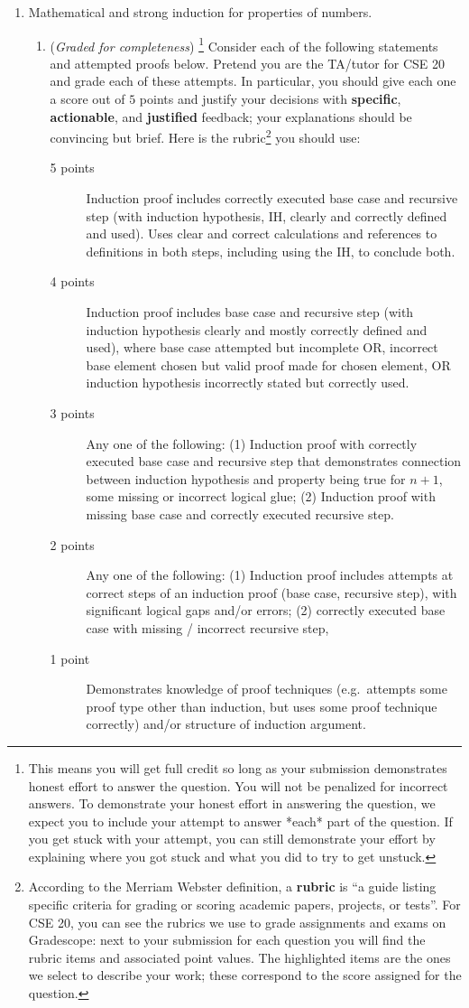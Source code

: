 \documentclass[12pt, oneside]{article}
\newcommand{\gradeComplete}{({\it Graded for completeness}) }
\newcommand{\gradeCompleteFirst}{\gradeComplete\footnote{This means you will 
get full credit so long as your submission demonstrates honest effort to 
answer the question. You will not be penalized for incorrect answers. 
To demonstrate your honest effort in answering the question, we 
expect you to include your attempt to answer *each* part of the question. 
If you get stuck with your attempt, you can still demonstrate 
your effort by explaining where you got stuck and what 
you did to try to get unstuck.} }
\begin{document}
\begin{enumerate}[labelindent=0pt, leftmargin=0pt]
    \item Mathematical and strong induction for properties of numbers.

    \begin{enumerate}
    \item \gradeCompleteFirst    Consider each of the following statements and attempted proofs below. Pretend you are the TA/tutor for CSE 20 and grade each of these attempts. 
    In particular, you should give each one a score out of $5$ points and justify your decisions with {\bf specific}, 
    {\bf actionable}, and {\bf justified} feedback;
    your explanations should be convincing but brief.
    Here is the rubric\footnote{According to the Merriam Webster definition, a {\bf rubric} is ``a guide listing specific criteria for grading or scoring academic papers, projects, or tests''. For CSE 20, you can see the rubrics 
    we use to grade assignments and exams on Gradescope: next to your submission for each question you will
    find the rubric items and associated point values. The highlighted items are the ones we select
    to describe your work; these correspond to the score assigned for the question.} you should use: 
    \begin{description}
    \item[5 points] Induction proof includes correctly executed base case
     and recursive step (with induction hypothesis, IH, clearly and correctly defined and used). Uses clear and correct calculations and references to definitions in both steps, including using the IH, to conclude both.
    \item[4 points] Induction proof includes base case and recursive step (with induction hypothesis clearly and mostly correctly defined and used),
    where base case attempted but incomplete OR, incorrect base element chosen but valid proof made for chosen
    element, OR induction hypothesis incorrectly stated but correctly used.
    \item[3 points] Any one of the following: (1) Induction proof with correctly executed base case 
    and recursive step that demonstrates
    connection between induction hypothesis and property being true for $n+1$, some missing or 
    incorrect logical glue; (2) Induction proof with missing base case and correctly executed recursive step.
    \item[2 points] Any one of the following: (1) Induction proof includes attempts at correct steps of an 
    induction proof (base case, recursive  step), with significant logical gaps and/or errors; (2) correctly executed base case 
    with missing / incorrect recursive step,
    \item[1 point] Demonstrates knowledge of proof techniques (e.g.\ attempts some proof type other than 
    induction, but uses some proof technique correctly) and/or structure of induction argument.
    \end{description}
    

\end{enumerate}
\end{enumerate}
\end{document}
